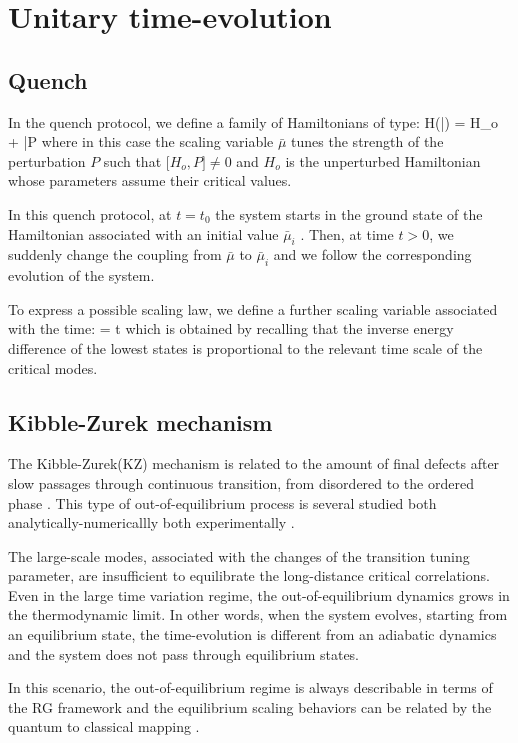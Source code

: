 \section{Unitary time-evolution}



\subsection{Quench}

In the quench protocol, we define a family of Hamiltonians of type:
H(\bar \mu) = H_o + \bar\mu P \cm
\ea
where in this case the scaling variable $\bar \mu$ tunes the strength of the perturbation
$P$ such that $\Bigr[ H_o , P] \neq 0$ and $H_o$ is the unperturbed Hamiltonian 
whose parameters assume their critical values.

In this quench protocol, at $t = t_0$ the system starts in the ground state
of the Hamiltonian associated with an initial value $\bar \mu_i$ . Then, at time $t>0$, we
suddenly change the coupling from $\bar \mu$ to $\bar \mu _i$ and we follow the 
corresponding evolution of the system.

To express a possible scaling law, we define a further scaling variable associated
with the time:
\theta = t \Delta \cm
\ee
which is obtained by recalling that the inverse energy difference of the lowest states
is proportional to the relevant time scale of the critical modes.

\subsection{Kibble-Zurek mechanism}

The Kibble-Zurek(KZ) mechanism is related to the amount of final defects after slow
passages through continuous transition, from disordered to the ordered phase 
\cite{kibble1976topology, kibble1980some, zurek1985cosmological, zurek1996cosmological, 
zurek2005dynamics}. This type of out-of-equilibrium process is several studied both
analytically-numericallly \cite{dziarmaga2010dynamics, PSSV-2011-noneqcoll,
chandran2012kibble, rossini2021coherent} both experimentally \cite{weiler2008spontaneous,
ulm2013observation}.

The large-scale modes, associated with the changes of the transition tuning parameter, are
insufficient to equilibrate the long-distance critical correlations. Even in the large
time variation regime, the out-of-equilibrium dynamics grows in the thermodynamic limit.
In other words, when the system evolves, starting from an equilibrium state, the
time-evolution is different from an adiabatic dynamics and the system does not pass 
through equilibrium states.

In this scenario, the out-of-equilibrium regime is always describable in terms of the RG
framework and the equilibrium scaling behaviors can be related by the quantum to classical
mapping \cite{rossini2021coherent, S99}.


